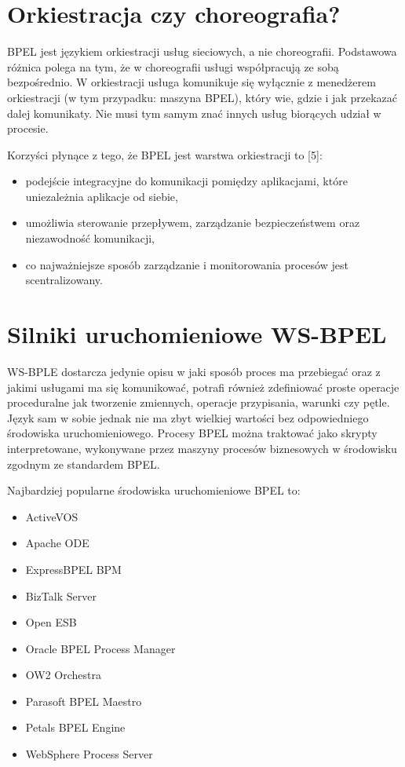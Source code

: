 
\section{Orkiestracja czy choreografia?}
\label{sec:bpelOrchestration}
BPEL jest językiem orkiestracji usług sieciowych, a nie choreografii. Podstawowa różnica polega na tym, że w choreografii usługi współpracują ze sobą bezpośrednio. W orkiestracji usługa komunikuje się wyłącznie z menedżerem orkiestracji (w tym przypadku: maszyna BPEL), który wie, gdzie i jak przekazać dalej komunikaty. Nie musi tym samym znać innych usług biorących udział w procesie. 

Korzyści płynące z tego, że BPEL jest warstwa orkiestracji to [5]:

\begin{itemize}
\item podejście integracyjne do komunikacji pomiędzy aplikacjami, które uniezależnia aplikacje od siebie,  
\item umożliwia sterowanie przepływem, zarządzanie bezpieczeństwem oraz niezawodność komunikacji,
\item co najważniejsze sposób zarządzanie i monitorowania procesów jest scentralizowany. 
\end{itemize}


\section{Silniki uruchomieniowe WS-BPEL}
\label{sec:bpelEngines}
WS-BPLE dostarcza jedynie opisu w jaki sposób proces ma przebiegać oraz z jakimi usługami ma się komunikować, potrafi również zdefiniować proste operacje proceduralne jak tworzenie zmiennych, operacje przypisania, warunki czy pętle. Język sam w sobie jednak nie ma zbyt wielkiej wartości bez odpowiedniego środowiska uruchomieniowego. Procesy BPEL można traktować jako skrypty interpretowane, wykonywane przez maszyny procesów biznesowych w środowisku zgodnym ze standardem BPEL. 

Najbardziej popularne środowiska uruchomieniowe BPEL to:

\begin{itemize}
\item ActiveVOS 
\item Apache ODE
\item ExpressBPEL BPM
\item BizTalk Server
\item Open ESB
\item Oracle BPEL Process Manager
\item OW2 Orchestra
\item Parasoft BPEL Maestro
\item Petals BPEL Engine
\item WebSphere Process Server
\end{itemize}

